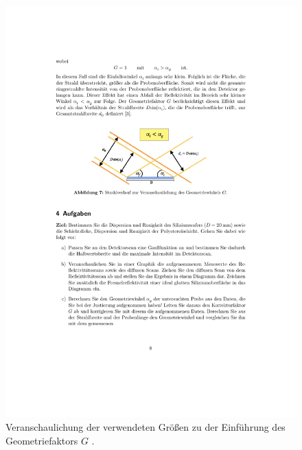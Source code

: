 \begin{figure}
    \centering
    \includegraphics{content/pics/Geometriewinkel.pdf}
    \caption{Veranschaulichung der verwendeten Größen zu der Einführung des Geometriefaktors $G$ \cite{V44}.}
    \label{fig:Geometriewinkel}
\end{figure}
